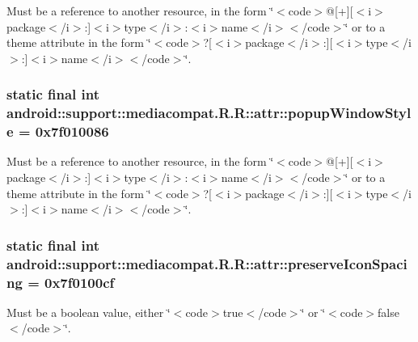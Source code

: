 Must be a reference to another resource, in the form \char`\"{}$<$code$>$@\mbox{[}+\mbox{]}\mbox{[}$<$i$>$package$<$/i$>$:\mbox{]}$<$i$>$type$<$/i$>$:$<$i$>$name$<$/i$>$$<$/code$>$\char`\"{} or to a theme attribute in the form \char`\"{}$<$code$>$?\mbox{[}$<$i$>$package$<$/i$>$:\mbox{]}\mbox{[}$<$i$>$type$<$/i$>$:\mbox{]}$<$i$>$name$<$/i$>$$<$/code$>$\char`\"{}. \hypertarget{classandroid_1_1support_1_1mediacompat_1_1_r_1_1attr_1f865294832613e200f8bf5ea2fd9a02}{
\subsubsection[{popupWindowStyle}]{\setlength{\rightskip}{0pt plus 5cm}static final int android::support::mediacompat.R.R::attr::popupWindowStyle = 0x7f010086}}
\label{classandroid_1_1support_1_1mediacompat_1_1_r_1_1attr_1f865294832613e200f8bf5ea2fd9a02}


Must be a reference to another resource, in the form \char`\"{}$<$code$>$@\mbox{[}+\mbox{]}\mbox{[}$<$i$>$package$<$/i$>$:\mbox{]}$<$i$>$type$<$/i$>$:$<$i$>$name$<$/i$>$$<$/code$>$\char`\"{} or to a theme attribute in the form \char`\"{}$<$code$>$?\mbox{[}$<$i$>$package$<$/i$>$:\mbox{]}\mbox{[}$<$i$>$type$<$/i$>$:\mbox{]}$<$i$>$name$<$/i$>$$<$/code$>$\char`\"{}. \hypertarget{classandroid_1_1support_1_1mediacompat_1_1_r_1_1attr_99ce726e8434f024bd798a154a625f84}{
\subsubsection[{preserveIconSpacing}]{\setlength{\rightskip}{0pt plus 5cm}static final int android::support::mediacompat.R.R::attr::preserveIconSpacing = 0x7f0100cf}}
\label{classandroid_1_1support_1_1mediacompat_1_1_r_1_1attr_99ce726e8434f024bd798a154a625f84}


Must be a boolean value, either \char`\"{}$<$code$>$true$<$/code$>$\char`\"{} or \char`\"{}$<$code$>$false$<$/code$>$\char`\"{}. 

